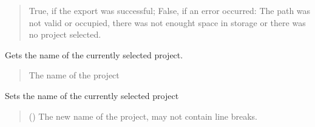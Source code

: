\documentclass[letterpaper,10pt,english]{sphinxmanual}
\begin{document}
\begin{fulllineitems}
\begin{fulllineitems}
\begin{quote}
\begin{description}
\sphinxAtStartPar
True, if the export was successful; False, if an error occurred: The path was not valid or occupied, there was not enought space in storage or there was no project selected.

\sphinxAtStartPar
{}

\end{description}\end{quote}

\end{fulllineitems}


\begin{fulllineitems}
\label{\detokenize{apidoc/src.osm_configurator.control:src.osm_configurator.control.control.Control.get_project_name}}
\pysigstartsignatures
{}
\pysigstopsignatures
\sphinxAtStartPar
Gets the name of the currently selected project.
\begin{quote}\begin{description}
\sphinxAtStartPar
The name of the project

\sphinxAtStartPar
{}

\end{description}\end{quote}

\end{fulllineitems}


\begin{fulllineitems}
\label{\detokenize{apidoc/src.osm_configurator.control:src.osm_configurator.control.control.Control.set_project_name}}
\pysigstartsignatures
{}
\pysigstopsignatures
\sphinxAtStartPar
Sets the name of the currently selected project
\begin{quote}\begin{description}
\sphinxAtStartPar
{} () \textendash{} The new name of the project, may not contain line breaks.


\end{description}
\end{quote}
\end{fulllineitems}
\end{fulllineitems}
\end{document}
